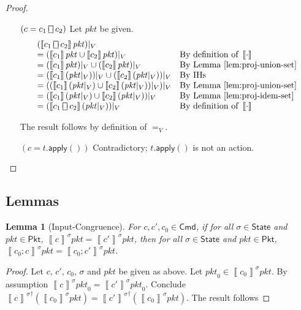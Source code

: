 \documentclass{article}
\newcommand{\pkt}{\mathit{pkt}}
\newcommand{\denote}[1]{\left\llbracket#1\right\rrbracket}
\newcommand{\Cmd}{\mathsf{Cmd}}
\newcommand{\Pkt}{\mathsf{Pkt}}
\newcommand{\State}{\mathsf{State}}
\newcommand{\apply}{\mathsf{apply}}
\newcommand{\choiceop}{\rotatebox[origin=c]{90}{$\sqsubset\!\!\!\sqsupset$}}
\newcommand{\choice}{\mathbin{\choiceop}}
\theoremstyle{plain}
\newtheorem{lemma}{Lemma}
\theoremstyle{definition}
\theoremstyle{remark}
\begin{document}
\begin{proof}
\begin{enumerate}[align=left]
  \item[$(c = c_1 \choice c_2)$] Let $\pkt$ be given.
    \[\begin{array}{ll}
    (\denote{c_1\choice c_2}\pkt)|_V \\
    = (\denote{c_1}\pkt \cup \denote{c_2}\pkt)|_V
    & \text{By definition of }\denote\cdot \\
    = (\denote{c_1}\pkt)|_V \cup (\denote{c_2}\pkt)|_V
    & \text{By Lemma~\ref{lem:proj-union-set}} \\
    = (\denote{c_1}(\pkt|_V))|_V \cup (\denote{c_2}(\pkt|_V))|_V
    & \text{By IHs} \\
    = ((\denote{c_1}(\pkt|_V) \cup \denote{c_2}(\pkt|_V))|_V)|_V
    & \text{By Lemma~\ref{lem:proj-union-set}} \\
    = (\denote{c_1}(\pkt|_V) \cup \denote{c_2}(\pkt|_V))|_V
    & \text{By Lemma~\ref{lem:proj-idem-set}}\\
    = (\denote{c_1 \choice c_2}(\pkt|_V))|_V
    & \text{By definition of }\denote\cdot \\
    \end{array}\]

    The result follows by definition of $=_V$.

  \item[$(c = t.\apply())$] Contradictory; $t.\apply()$ is not an action.
  \end{enumerate}

\end{proof}




\subsection{Lemmas}

\begin{lemma}[Input-Congruence]
  \label{lem:input-congruence}
  For $c,c',c_0 \in \Cmd$,
  if for all $\sigma \in \State$ and $\pkt \in \Pkt$, $\denote{c}^\sigma \pkt = \denote{c'}^\sigma \pkt$,
  then for all $\sigma \in \State$ and $\pkt \in \Pkt$, $\denote{c_0;c}^\sigma \pkt = \denote{c_0;c'}^\sigma\pkt$.
\end{lemma}
\begin{proof}
  Let $c$, $c'$, $c_0$, $\sigma$ and $\pkt$ be given as above.
  Let $\pkt_0 \in \denote{c_0}^\sigma \pkt$. By assumption $\denote{c}^\sigma \pkt_0 = \denote{c'}^\sigma \pkt_0$.
  Conclude ${\denote{c}^\sigma}^\dagger\left(\denote{c_0}^\sigma\pkt\right) = {\denote{c'}^\sigma}^\dagger\left(\denote{c_0}^\sigma\pkt\right)$. The result follows

\end{proof}
\end{document}
